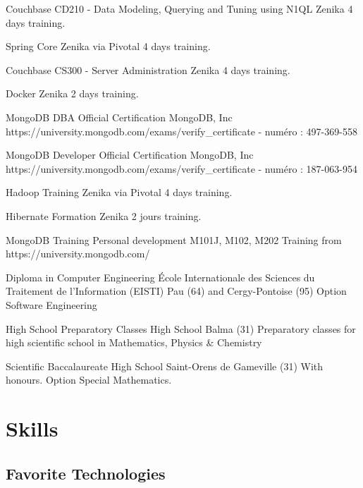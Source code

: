 \documentclass[11pt,a4paper]{moderncv}
\begin{document}
{Couchbase CD210 - Data Modeling, Querying and Tuning using N1QL}
{Zenika}
{}
{}
{4 days training.}

{Spring Core}
{Zenika via Pivotal}
{}
{}
{4 days training.}

{Couchbase CS300 - Server Administration}
{Zenika}
{}
{}
{4 days training.}

{Docker}
{Zenika}
{}
{}
{2 days training.}

{MongoDB DBA Official Certification}
{MongoDB, Inc}
{}
{}
{https://university.mongodb.com/exams/verify\_certificate - numéro : 497-369-558}

{MongoDB Developer Official Certification}
{MongoDB, Inc}
{}
{}
{https://university.mongodb.com/exams/verify\_certificate - numéro : 187-063-954}

{Hadoop Training}
{Zenika via Pivotal}
{}
{}
{4 days training.}

{Hibernate Formation}
{Zenika}
{}
{}
{2 jours training.}

{MongoDB Training}
{Personal development}
{}
{}
{M101J, M102, M202 Training from https://university.mongodb.com/}

{Diploma in Computer Engineering}
{\'Ecole Internationale des Sciences du Traitement de l’Information (EISTI)}
{Pau (64) and Cergy-Pontoise (95)}
{}
{Option Software Engineering}

{High School Preparatory Classes}
{High School}
{Balma (31)}
{}
{Preparatory classes for high scientific school in Mathematics, Physics \& Chemistry}

{Scientific Baccalaureate}
{High School}
{Saint-Orens de Gameville (31)}
{With honours.}
{Option Special Mathematics.}

\section{Skills}

\subsection{Favorite Technologies}
\end{document}
